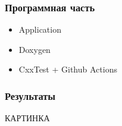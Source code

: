 \documentclass{beamer}
\begin{document}


\begin{frame}
\frametitle{Программная часть}

\begin{itemize}
\item Application
\item Doxygen
\item CxxTest + Github Actions
\end{itemize}
\end{frame}

\begin{frame}
\frametitle{Результаты}

КАРТИНКА

\end{frame}
\end{document}
